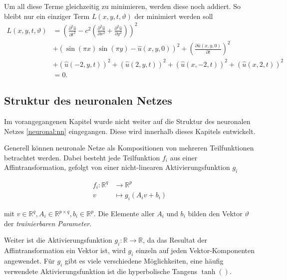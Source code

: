 Um all diese Terme gleichzeitig zu minimieren, werden diese noch addiert. So bleibt nur ein einziger Term \( L(x, y, t, \vartheta) \) der minimiert werden soll
\begin{equation}
    \begin{aligned}
        L(x, y, t, \vartheta) &= \left(\frac{\partial^2 \hat{u}}{\partial t^2} - c^2 \left( \frac{\partial^2 \hat{u}}{\partial x^2} + \frac{\partial^2 \hat{u}}{\partial y^2} \right)\right)^2\\
        &+ \left(\sin(\pi x) \sin(\pi y) - \hat{u}(x, y, 0)\right)^2
        + \left(\frac{\partial \hat{u}(x, y, 0)}{\partial t}\right)^2\\
        &+ \left(\hat{u}(-2, y, t)\right)^2
        + \left(\hat{u}(2, y, t)\right)^2
        + \left(\hat{u}(x, -2, t)\right)^2
        + \left(\hat{u}(x, 2, t)\right)^2\\
        &= 0.
    \end{aligned}
    \label{neuronal:optimierung}
\end{equation}


\subsection{Struktur des neuronalen Netzes}\label{neuronal:subsection:struktur_nn}

Im vorangegangenen Kapitel wurde nicht weiter auf die Struktur des neuronalen Netzes \eqref{neuronal:nn} eingegangen.
Diese wird innerhalb dieses Kapitels entwickelt.

Generell können neuronale Netze als Kompositionen von mehreren Teilfunktionen betrachtet werden.
Dabei besteht jede Teilfunktion \( f_i \) aus einer Affintransformation, gefolgt von einer nicht-linearen Aktivierungsfunktion \( g_i \)

\begin{align*}
    f_i\colon \mathbb{R}^q & \longrightarrow\mathbb{R}^p \\[-1ex]
    v & \longmapsto g_i(A_iv + b_i)
\end{align*}

mit \( v \in \mathbb{R}^q, A_i \in \mathbb{R}^{p \times q}, b_i \in \mathbb{R}^p \). 
Die Elemente aller \( A_i \) und \( b_i \) bilden den Vektor \( \vartheta \) der \emph{trainierbaren Parameter}.

Weiter ist die Aktivierungsfunktion \( g_i\colon \mathbb{R} \longrightarrow\mathbb{R} \), da das Resultat der Affintransformation ein Vektor ist, wird \( g_i \) einzeln auf jeden Vektor-Komponenten angewendet.
Für \( g_i \) gibt es viele verschiedene Möglichkeiten, eine häufig verwendete Aktivierungsfunktion ist die hyperbolische Tangens \( \tanh() \).

